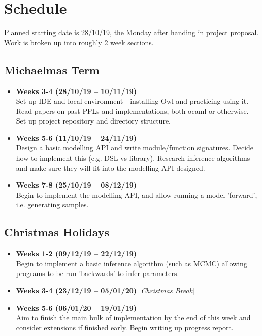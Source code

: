 \section*{Schedule}
Planned starting date is {28/10/19}, the Monday after handing in project proposal. Work is broken up into roughly 2 week sections.

\subsection*{Michaelmas Term}
\begin{itemize}
      \item {\bf Weeks 3-4 (28/10/19 -- 10/11/19)} \\ Set up IDE and local environment - installing Owl and practicing using it. Read papers on past PPLs and implementations, both ocaml or otherwise. Set up project repository and directory structure.
      \item \textbf{Weeks 5-6 (11/10/19 -- 24/11/19)} \\ Design a basic modelling API and write module/function signatures. Decide how to implement this (e.g. DSL vs library). Research inference algorithms and make sure they will fit into the modelling API designed.
      \item \textbf{Weeks 7-8 (25/10/19 -- 08/12/19)} \\ Begin to implement the modelling API, and allow running a model 'forward', i.e. generating samples.
\end{itemize}
\subsection*{Christmas Holidays}
\begin{itemize}
      \item \textbf{Weeks 1-2 (09/12/19 -- 22/12/19)}\\ Begin to implement a basic inference algorithm (such as MCMC) allowing programs to be run 'backwards' to infer parameters.
      \item \textbf{Weeks 3-4 (23/12/19 -- 05/01/20)} [\textit{Christmas Break}]
      \item \textbf{Weeks 5-6 (06/01/20 -- 19/01/19)}\\ Aim to finish the main bulk of implementation by the end of this week and consider extensions if finished early. Begin writing up progress report.
\end{itemize}
